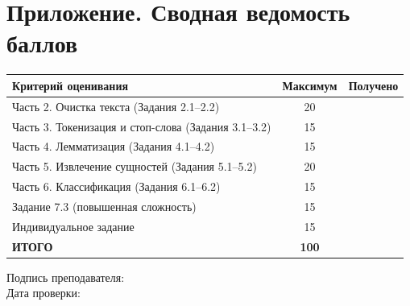 \documentclass[12pt, a4paper]{report}
\begin{document}
\chapter*{Приложение. Сводная ведомость баллов}
\thispagestyle{plain}

\begin{tcolorbox}[infobox, title={Заполняется преподавателем}]
  \begin{tabularx}{\linewidth}{X c c}
    \toprule
    \rowcolor{LightBlue}
    \textsf{\textbf{Критерий оценивания}} &
    \textsf{\textbf{Максимум}} &
    \textsf{\textbf{Получено}} \\
    \midrule
    Часть 2. Очистка текста (Задания 2.1–2.2)          & 20 & \\
    Часть 3. Токенизация и стоп-слова (Задания 3.1–3.2) & 15 & \\
    Часть 4. Лемматизация (Задания 4.1–4.2)             & 15 & \\
    Часть 5. Извлечение сущностей (Задания 5.1–5.2)     & 20 & \\
    Часть 6. Классификация (Задания 6.1–6.2)            & 15 & \\
    Задание 7.3 (повышенная сложность)                  & 15 & \\
    Индивидуальное задание                              & 15 & \\
    \midrule
    \textbf{ИТОГО}                                      & \textbf{100} & \\
    \bottomrule
  \end{tabularx}
\end{tcolorbox}

\vspace{24pt}
\noindent Подпись преподавателя: \underline{\hspace{6cm}}
\\[12pt]
\noindent Дата проверки: \underline{\hspace{4cm}}
\end{document}

